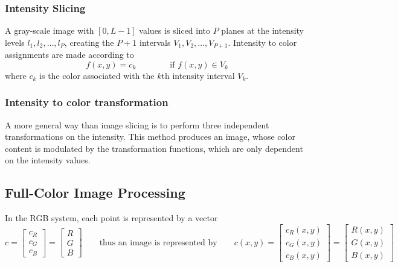 \subsubsection{Intensity Slicing }
A gray-scale image with $[0,L-1]$ values is sliced into $P$ planes at the intensity levels $l_1,l_2,\dots,l_P$, creating the $P+1$ intervals $V_1,V_2,\dots,V_{P+1}$. Intensity to color assignments are made according to
\begin{equation}
	f(x,y) = c_k \qquad \qquad \text{if } f(x,y) \in V_k
\end{equation}
where $c_k$ is the color associated with the $k$th intensity interval $V_k$.

\subsubsection{Intensity to color transformation }
\begin{minipage}{12cm}
	A more general way than image slicing is to perform three independent transformations on the intensity. This method produces an image, whose color content is modulated by the transformation functions, which are only dependent on the intensity values.
\end{minipage}
\begin{minipage}{6cm}
\end{minipage}

\subsection{Full-Color Image Processing }
In the RGB system, each point is represented by a vector
\begin{equation}
	c = \left[\begin{array}{l}
		c_R \\ c_G \\ c_B
	\end{array} \right]
	= \left[\begin{array}{l}
		R \\ G \\ B
	\end{array} \right]
	\qquad \text{thus an image is represented by} \qquad
	c(x,y) = \left[\begin{array}{l}
		c_R(x,y) \\ c_G(x,y) \\ c_B(x,y)
	\end{array} \right]
	= \left[\begin{array}{l}
		R(x,y) \\ G(x,y) \\ B(x,y)
	\end{array} \right]	
\end{equation}

